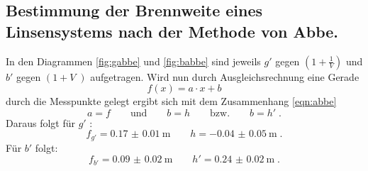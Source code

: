 \FloatBarrier
\subsection{Bestimmung der Brennweite eines Linsensystems nach der Methode von Abbe.}
In den Diagrammen \ref{fig:gabbe} und \ref{fig:babbe} sind jeweils
$g'$ gegen $\left(1 + \frac{1}{V}\right)$ und $b'$ gegen $ \left(1 + V\; \right)$
aufgetragen. Wird nun durch Ausgleichsrechnung eine Gerade
\begin{equation*}
  f(x) = a \cdot x + b
\end{equation*}
durch die Messpunkte gelegt ergibt sich mit dem Zusammenhang \eqref{eqn:abbe}
\begin{equation*}
  a = f \qquad \text{und} \qquad b = h \qquad \text{bzw.} \qquad b = h' \; .
\end{equation*}
Daraus folgt für $g'$ :
\begin{equation*}
  f_{g'} = \SI{0.17(1)}{\meter} \qquad h = \SI{-0.04(5)}{\meter} \;.
\end{equation*}
Für $b'$ folgt:
\begin{equation*}
  f_{b'} = \SI{0.09(2)}{\meter} \qquad h' = \SI{0.24(2)}{\meter} \;.
\end{equation*}
